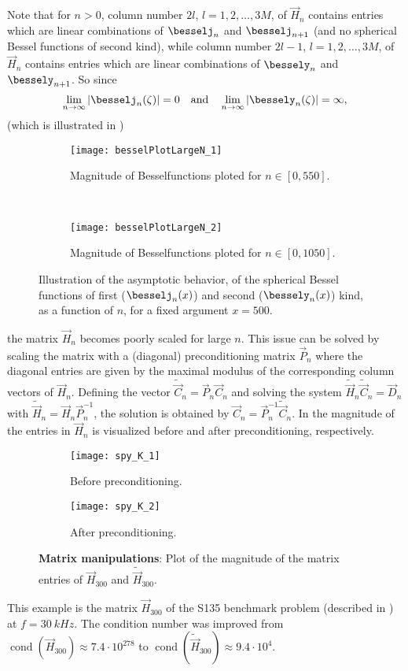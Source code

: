 Note that for $n>0$, column number $2l$, $l=1, 2, \dots, 3M$, of $\vec{H}_n$ contains entries which are linear combinations of $\besselj_n$ and $\besselj_{n+1}$ (and no spherical Bessel functions of second kind), while column number $2l-1$, $l=1, 2, \dots, 3M$, of $\vec{H}_n$ contains entries which are linear combinations of $\bessely_n$ and $\bessely_{n+1}$. So since
\begin{equation}
	\lim_{n\to\infty} |\besselj_n(\zeta)| = 0\quad\text{and}\quad \lim_{n\to\infty} |\bessely_n(\zeta)| = \infty,
\end{equation}
(which is illustrated in )
\begin{figure}
	\centering
	\begin{subfigure}[t]{0.48\textwidth}
		\centering
		\texttt{[image: besselPlotLargeN\_1]}
		\caption{Magnitude of Besselfunctions ploted for ${n\in[0,550]}$.}
	\end{subfigure}
	~
	\begin{subfigure}[t]{0.48\textwidth}
		\centering
		\texttt{[image: besselPlotLargeN\_2]}
		\caption{Magnitude of Besselfunctions ploted for $n\in[0,1050]$.}
	\end{subfigure}
	\caption{Illustration of the asymptotic behavior, of the spherical Bessel functions of first ($\besselj_n(x)$) and second ($\bessely_n(x)$) kind, as a function of $n$, for a fixed argument $x=500$.}
	\label{Fig1:besselPlotLargeN}
\end{figure}
the matrix $\vec{H}_n$ becomes poorly scaled for large $n$. This issue can be solved by scaling the matrix with a (diagonal) preconditioning matrix $\vec{P}_n$ where the diagonal entries are given by the maximal modulus of the corresponding column vectors of $\vec{H}_n$. Defining the vector $\tilde{\vec{C}}_n = \vec{P}_n\vec{C}_n$ and solving the system $\tilde{\vec{H}}_n\tilde{\vec{C}}_n = \vec{D}_n$ with $\tilde{\vec{H}}_n = \vec{H}_n \vec{P}_n^{-1}$, the solution is obtained by $\vec{C}_n = \vec{P}_n^{-1}\tilde{\vec{C}}_n$. In  the magnitude of the entries in $\vec{H}_n$ is visualized before and after preconditioning, respectively.
\begin{figure}
	\centering
	\begin{subfigure}{\textwidth}
		\centering
		\texttt{[image: spy\_K\_1]}
		\caption{Before preconditioning.}
		\label{Fig1:Spy2K}
	\end{subfigure}
	\par\bigskip
	\begin{subfigure}{\textwidth}
		\centering
		\texttt{[image: spy\_K\_2]}
		\caption{After preconditioning.}
		\label{Fig1:Spy2K2}
	\end{subfigure}
	\caption{\textbf{Matrix manipulations}: Plot of the magnitude of the matrix entries of $\vec{H}_{300}$ and $\tilde{\vec{H}}_{300}$.}
	\label{Fig1:SpyK}
\end{figure}
This example is the matrix $\vec{H}_{300}$ of the S135 benchmark problem (described in ) at $f=\SI{30}{kHz}$. The condition number was improved from $\operatorname{cond}(\vec{H}_{300}) \approx 7.4\cdot 10^{278}$ to $\operatorname{cond}(\tilde{\vec{H}}_{300}) \approx 9.4\cdot 10^4$.

